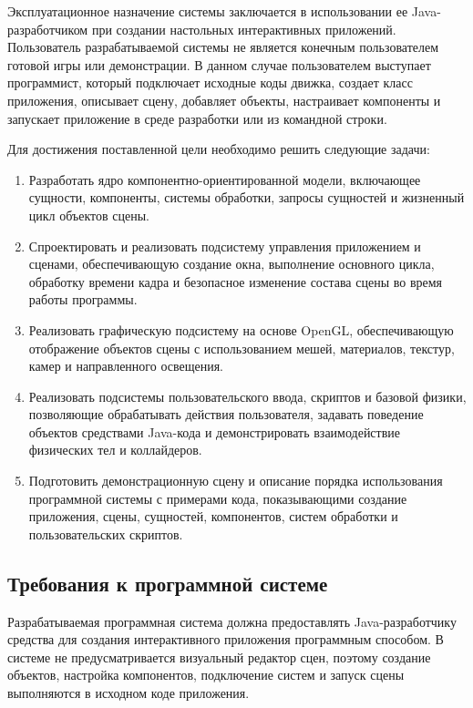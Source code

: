 Эксплуатационное назначение системы заключается в использовании ее Java-разработчиком при создании настольных интерактивных приложений. Пользователь разрабатываемой системы не является конечным пользователем готовой игры или демонстрации. В данном случае пользователем выступает программист, который подключает исходные коды движка, создает класс приложения, описывает сцену, добавляет объекты, настраивает компоненты и запускает приложение в среде разработки или из командной строки.

Для достижения поставленной цели необходимо решить следующие задачи:
{
\renewcommand{\labelenumi}{\arabic{enumi}.}
\begin{enumerate}
\item Разработать ядро компонентно-ориентированной модели, включающее сущности, компоненты, системы обработки, запросы сущностей и жизненный цикл объектов сцены.

\item Спроектировать и реализовать подсистему управления приложением и сценами, обеспечивающую создание окна, выполнение основного цикла, обработку времени кадра и безопасное изменение состава сцены во время работы программы.

\item Реализовать графическую подсистему на основе OpenGL, обеспечивающую отображение объектов сцены с использованием мешей, материалов, текстур, камер и направленного освещения.

\item Реализовать подсистемы пользовательского ввода, скриптов и базовой физики, позволяющие обрабатывать действия пользователя, задавать поведение объектов средствами Java-кода и демонстрировать взаимодействие физических тел и коллайдеров.

\item Подготовить демонстрационную сцену и описание порядка использования программной системы с примерами кода, показывающими создание приложения, сцены, сущностей, компонентов, систем обработки и пользовательских скриптов.
\end{enumerate}
}

\subsection{Требования к программной системе}

Разрабатываемая программная система должна предоставлять Java-разработчику средства для создания интерактивного приложения программным способом. В системе не предусматривается визуальный редактор сцен, поэтому создание объектов, настройка компонентов, подключение систем и запуск сцены выполняются в исходном коде приложения.

